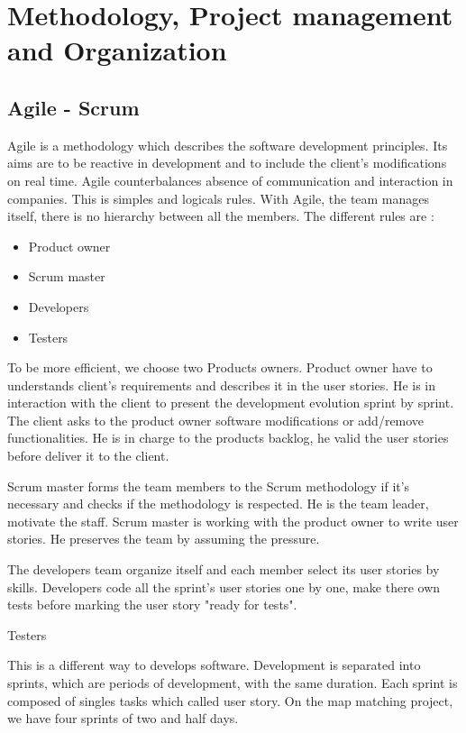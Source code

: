 \chapter{Methodology, Project management and Organization}

\section{Agile - Scrum}
Agile is a methodology which describes the software development principles. Its aims
are to be reactive in development and to include the client's modifications on real time.
Agile counterbalances absence of communication and interaction in companies.
This is simples and logicals rules.
With Agile, the team manages itself, there is no hierarchy between all the members.
The different rules are :
\begin{itemize}
	\item Product owner
	\item Scrum master
	\item Developers
	\item Testers
\end{itemize}
To be more efficient, we choose two Products owners.
Product owner have to understands client's requirements and describes it in the user stories. He is in interaction with the client to present the development evolution sprint by sprint. The client asks to the product owner software modifications or add/remove functionalities.
He is in charge to the products backlog, he valid the user stories before deliver it to the client.

Scrum master forms the team members to the Scrum methodology if it's necessary and checks if the methodology is respected.
He is the team leader, motivate the staff.
Scrum master is working with the product owner to write user stories.
He preserves the team by assuming the pressure.

The developers team organize itself and each member select its user stories by skills.
Developers code all the sprint's user stories one by one, make there own tests before marking the user story "ready for tests".

Testers 

This is a different way to develops software. Development is separated into sprints, which are periods of development, with the same duration.
Each sprint is composed of singles tasks which called user story.
On the map matching project, we have four sprints of two and half days.
